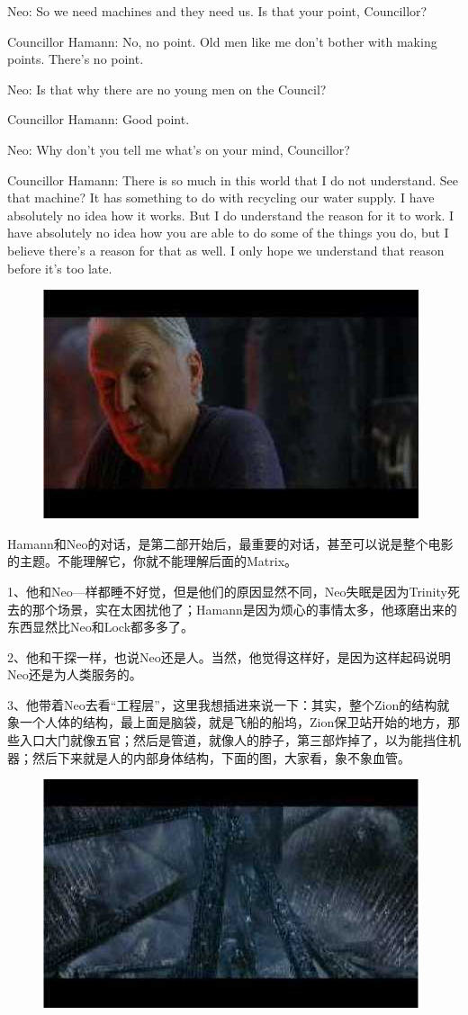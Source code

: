 \documentclass[UTF8]{ctexart}
\newenvironment{myquote}{\color{green} \setlength{\leftskip}{6em} \setlength{\rightskip}{4em} \setlength{\parindent}{-2em}}{\par}
\begin{document}
\begin{myquote}
Neo: So we need machines and they need us. Is that your point, Councillor?

Councillor Hamann: No, no point. Old men like me don't bother with making points. There's no point.

Neo: Is that why there are no young men on the Council?

Councillor Hamann: Good point.

Neo: Why don't you tell me what's on your mind, Councillor?

Councillor Hamann: There is so much in this world that I do not understand. See that machine? It has something to do with recycling our water supply. I have absolutely no idea how it works. But I do understand the reason for it to work. I have absolutely no idea how you are able to do some of the things you do, but I believe there's a reason for that as well. I only hope we understand that reason before it's too late.
\end{myquote}

\begin{figure}[htb]
\centering
\includegraphics[width=0.5\linewidth]{fig/read_reloaded-50}
\end{figure}

Hamann和Neo的对话，是第二部开始后，最重要的对话，甚至可以说是整个电影的主题。不能理解它，你就不能理解后面的Matrix。

1、他和Neo—样都睡不好觉，但是他们的原因显然不同，Neo失眠是因为Trinity死去的那个场景，实在太困扰他了；Hamann是因为烦心的事情太多，他琢磨出来的东西显然比Neo和Lock都多多了。

2、他和干探一样，也说Neo还是人。当然，他觉得这样好，是因为这样起码说明Neo还是为人类服务的。

3、他带着Neo去看“工程层”，这里我想插进来说一下：其实，整个Zion的结构就象一个人体的结构，最上面是脑袋，就是飞船的船坞，Zion保卫站开始的地方，那些入口大门就像五官；然后是管道，就像人的脖子，第三部炸掉了，以为能挡住机器；然后下来就是人的内部身体结构，下面的图，大家看，象不象血管。

\begin{figure}[htb]
\centering
\includegraphics[width=0.5\linewidth]{fig/read_reloaded-51}
\end{figure}
\end{document}
